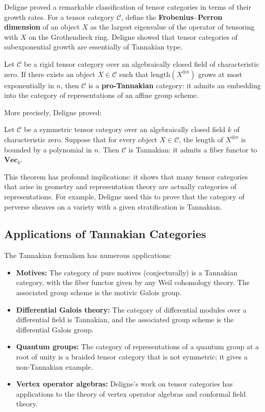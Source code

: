 Deligne proved a remarkable classification of tensor categories in terms of their growth rates. For a tensor category \(\mathcal{C}\), define the \textbf{Frobenius--Perron dimension} of an object \(X\) as the largest eigenvalue of the operator of tensoring with \(X\) on the Grothendieck ring. Deligne showed that tensor categories of subexponential growth are essentially of Tannakian type.

\begin{theorem}[Deligne, 1990]
Let \(\mathcal{C}\) be a rigid tensor category over an algebraically closed field of characteristic zero. If there exists an object \(X \in \mathcal{C}\) such that \(\text{length}(X^{\otimes n})\) grows at most exponentially in \(n\), then \(\mathcal{C}\) is a \textbf{pro-Tannakian} category: it admits an embedding into the category of representations of an affine group scheme.
\end{theorem}

More precisely, Deligne proved:

\begin{theorem}
Let \(\mathcal{C}\) be a symmetric tensor category over an algebraically closed field \(k\) of characteristic zero. Suppose that for every object \(X \in \mathcal{C}\), the length of \(X^{\otimes n}\) is bounded by a polynomial in \(n\). Then \(\mathcal{C}\) is Tannakian: it admits a fiber functor to \(\mathbf{Vec}_{k}\).
\end{theorem}

This theorem has profound implications: it shows that many tensor categories that arise in geometry and representation theory are actually categories of representations. For example, Deligne used this to prove that the category of perverse sheaves on a variety with a given stratification is Tannakian.

\subsection{Applications of Tannakian Categories}

The Tannakian formalism has numerous applications:
\begin{itemize}
    \item \textbf{Motives:} The category of pure motives (conjecturally) is a Tannakian category, with the fiber functor given by any Weil cohomology theory. The associated group scheme is the motivic Galois group.
    \item \textbf{Differential Galois theory:} The category of differential modules over a differential field is Tannakian, and the associated group scheme is the differential Galois group.
    \item \textbf{Quantum groups:} The category of representations of a quantum group at a root of unity is a braided tensor category that is not symmetric; it gives a non-Tannakian example.
    \item \textbf{Vertex operator algebras:} Deligne's work on tensor categories has applications to the theory of vertex operator algebras and conformal field theory.
\end{itemize}

